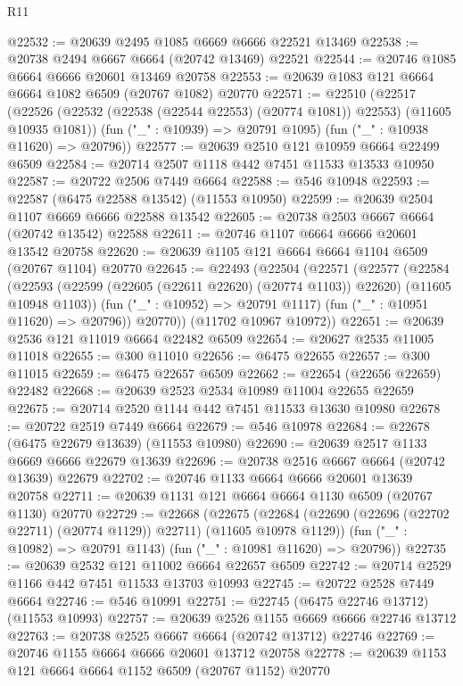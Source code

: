 \begin{lexlean}{R11}
\begin{coremodule}
{{{{{{{{{{{{{{{{{{{{{{{{{{{{{{{{{{{{{{{{{{{{{{{{{{{{{{{{{{{{{{{{{{{{{{{{{{{{{{{{{{@22532 := @20639 @2495 @1085 @6669 @6666 @22521 @13469
@22538 := @20738 @2494 @6667 @6664 (@20742 @13469) @22521
@22544 := @20746 @1085 @6664 @6666 @20601 @13469 @20758
@22553 := @20639 @1083 @121 @6664 @6664 @1082 @6509 (@20767 @1082) @20770
@22571 := @22510
    (@22517
      (@22526 (@22532 (@22538 (@22544 @22553) (@20774 @1081)) @22553) (@11605 @10935 @1081))
      (fun ("_" : @10939) => @20791 @1095)
      (fun ("_" : @10938 @11620) => @20796))
@22577 := @20639 @2510 @121 @10959 @6664 @22499 @6509
@22584 := @20714 @2507 @1118 @442 @7451 @11533 @13533 @10950
@22587 := @20722 @2506 @7449 @6664
@22588 := @546 @10948
@22593 := @22587 (@6475 @22588 @13542) (@11553 @10950)
@22599 := @20639 @2504 @1107 @6669 @6666 @22588 @13542
@22605 := @20738 @2503 @6667 @6664 (@20742 @13542) @22588
@22611 := @20746 @1107 @6664 @6666 @20601 @13542 @20758
@22620 := @20639 @1105 @121 @6664 @6664 @1104 @6509 (@20767 @1104) @20770
@22645 := @22493
    (@22504
      (@22571
        (@22577
          (@22584
            (@22593 (@22599 (@22605 (@22611 @22620) (@20774 @1103)) @22620) (@11605 @10948 @1103))
            (fun ("_" : @10952) => @20791 @1117)
            (fun ("_" : @10951 @11620) => @20796))
          @20770))
      (@11702 @10967 @10972))
@22651 := @20639 @2536 @121 @11019 @6664 @22482 @6509
@22654 := @20627 @2535 @11005 @11018
@22655 := @300 @11010
@22656 := @6475 @22655
@22657 := @300 @11015
@22659 := @6475 @22657 @6509
@22662 := @22654 (@22656 @22659) @22482
@22668 := @20639 @2523 @2534 @10989 @11004 @22655 @22659
@22675 := @20714 @2520 @1144 @442 @7451 @11533 @13630 @10980
@22678 := @20722 @2519 @7449 @6664
@22679 := @546 @10978
@22684 := @22678 (@6475 @22679 @13639) (@11553 @10980)
@22690 := @20639 @2517 @1133 @6669 @6666 @22679 @13639
@22696 := @20738 @2516 @6667 @6664 (@20742 @13639) @22679
@22702 := @20746 @1133 @6664 @6666 @20601 @13639 @20758
@22711 := @20639 @1131 @121 @6664 @6664 @1130 @6509 (@20767 @1130) @20770
@22729 := @22668
    (@22675
      (@22684 (@22690 (@22696 (@22702 @22711) (@20774 @1129)) @22711) (@11605 @10978 @1129))
      (fun ("_" : @10982) => @20791 @1143)
      (fun ("_" : @10981 @11620) => @20796))
@22735 := @20639 @2532 @121 @11002 @6664 @22657 @6509
@22742 := @20714 @2529 @1166 @442 @7451 @11533 @13703 @10993
@22745 := @20722 @2528 @7449 @6664
@22746 := @546 @10991
@22751 := @22745 (@6475 @22746 @13712) (@11553 @10993)
@22757 := @20639 @2526 @1155 @6669 @6666 @22746 @13712
@22763 := @20738 @2525 @6667 @6664 (@20742 @13712) @22746
@22769 := @20746 @1155 @6664 @6666 @20601 @13712 @20758
@22778 := @20639 @1153 @121 @6664 @6664 @1152 @6509 (@20767 @1152) @20770
}}}}}}}}}}}}}}}}}}}}}}}}}}}}}}}}}}}}}}}}}}}}}}}}}}}}}}}}}}}}}}}}}}}}}}}}}}}}}}}}}}
\end{coremodule}
\end{lexlean}
